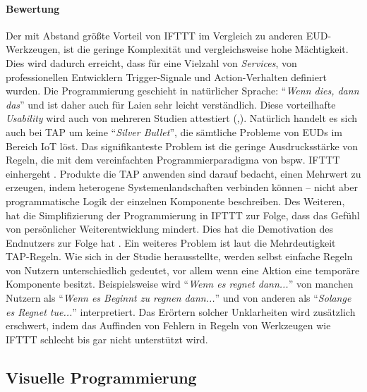 \paragraph{Bewertung} Der mit Abstand größte Vorteil von IFTTT im Vergleich zu anderen \ac{EUD}-Werkzeugen, ist die geringe Komplexität und vergleichsweise hohe Mächtigkeit. Dies wird dadurch erreicht, dass für eine Vielzahl von \textit{Services}, von professionellen Entwicklern Trigger-Signale und Action-Verhalten definiert wurden. Die Programmierung geschieht in natürlicher Sprache: "`\textit{Wenn dies, dann das}"' und ist daher auch für Laien sehr leicht verständlich. Diese vorteilhafte \textit{Usability} wird auch von mehreren Studien attestiert (\cite{huang2015supporting},\cite{ur2014practical}). 
Natürlich handelt es sich auch bei \ac{TAP} um keine "`\textit{Silver Bullet}"', die sämtliche Probleme von \acp{EUD} im Bereich \ac{IoT} löst. Das signifikanteste Problem ist die geringe Ausdrucksstärke von Regeln, die mit dem vereinfachten Programmierparadigma von bspw. IFTTT einhergeht \cite{ur2016trigger}. Produkte die \ac{TAP} anwenden sind darauf bedacht, einen Mehrwert zu erzeugen, indem heterogene Systemenlandschaften verbinden können -- nicht aber programmatische Logik der einzelnen Komponente beschreiben. Des Weiteren, hat die Simplifizierung der Programmierung in IFTTT zur Folge, dass das Gefühl von persönlicher Weiterentwicklung mindert. Dies hat die Demotivation des Endnutzers zur Folge hat \cite{ur2016trigger}. Ein weiteres Problem ist laut \cite{huang2015supporting} die Mehrdeutigkeit \ac{TAP}-Regeln. Wie sich in der Studie herausstellte, werden selbst einfache Regeln von Nutzern unterschiedlich gedeutet, vor allem wenn eine Aktion eine temporäre Komponente besitzt. Beispielsweise wird "`\textit{Wenn es regnet dann...}"' von manchen Nutzern als "`\textit{Wenn es Beginnt zu regnen dann...}"' und von anderen als "`\textit{Solange es Regnet tue...}"' interpretiert. Das Erörtern solcher Unklarheiten wird zusätzlich erschwert, indem das Auffinden von Fehlern in Regeln von Werkzeugen wie IFTTT schlecht bis gar nicht unterstützt wird.

\subsection{Visuelle Programmierung}\label{subsubsec:samlabs}

